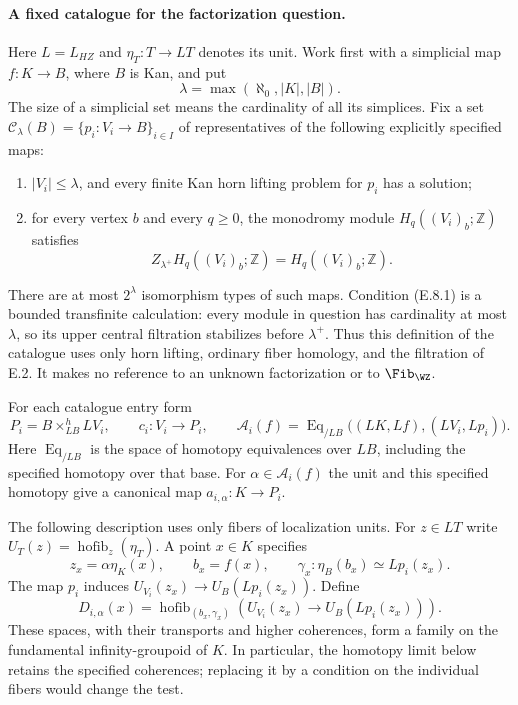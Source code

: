 \paragraph{A fixed catalogue for the factorization question.}
Here $L=L_{HZ}$ and $\eta_T:T\to LT$ denotes its unit.
Work first with a simplicial map $f:K\to B$, where $B$ is Kan,
and put
\[
                 \lambda=\max(\aleph_0,|K|,|B|).
\]
The size of a simplicial set means the cardinality of all its
simplices. Fix a set $\mathcal C_\lambda(B)=\{p_i:V_i\to B\}_{i\in I}$
of representatives of the following explicitly specified maps:
\begin{enumerate}
\item $|V_i|\leq\lambda$, and every finite Kan horn lifting problem
for $p_i$ has a solution;
\item for every vertex $b$ and every $q\geq0$, the monodromy module
$H_q((V_i)_b;\mathbb Z)$ satisfies
\[
 Z_{\lambda^+}H_q((V_i)_b;\mathbb Z)=H_q((V_i)_b;\mathbb Z).
                                                               \tag{E.8.1}
\]
\end{enumerate}
There are at most $2^\lambda$ isomorphism types of such maps.
Condition (E.8.1) is a bounded transfinite calculation: every module
in question has cardinality at most $\lambda$, so its upper central
filtration stabilizes before $\lambda^+$. Thus this definition of
the catalogue uses only horn lifting, ordinary fiber homology,
and the filtration of E.2. It makes no reference to an unknown
factorization or to $\Fib_{\WZ}$.

For each catalogue entry form
\[
 P_i=B\times^h_{LB}LV_i,\qquad
 c_i:V_i\longrightarrow P_i,\qquad
 \mathcal A_i(f)=
 \operatorname{Eq}_{/LB}\bigl((LK,Lf),(LV_i,Lp_i)\bigr).
                                                               \tag{E.8.2}
\]
Here $\operatorname{Eq}_{/LB}$ is the space of homotopy equivalences
over $LB$, including the specified homotopy over that base.
For $\alpha\in\mathcal A_i(f)$ the unit and this specified homotopy
give a canonical map $a_{i,\alpha}:K\to P_i$.

The following description uses only fibers of localization units.
For $z\in LT$ write $U_T(z)=\operatorname{hofib}_z(\eta_T)$.
A point $x\in K$ specifies
\[
 z_x=\alpha\eta_K(x),\qquad
 b_x=f(x),\qquad
 \gamma_x:\eta_B(b_x)\simeq Lp_i(z_x).
\]
The map $p_i$ induces
$U_{V_i}(z_x)\to U_B(Lp_i(z_x))$. Define
\[
 D_{i,\alpha}(x)=
 \operatorname{hofib}_{(b_x,\gamma_x)}
 \left(U_{V_i}(z_x)\longrightarrow U_B(Lp_i(z_x))\right).
                                                               \tag{E.8.3}
\]
These spaces, with their transports and higher coherences, form a
family on the fundamental infinity-groupoid of $K$. In particular,
the homotopy limit below retains the specified coherences; replacing
it by a condition on the individual fibers would change the test.

